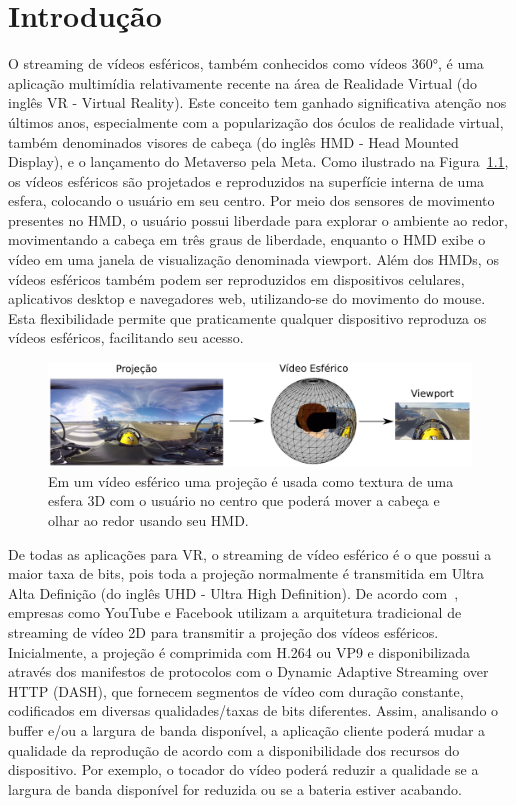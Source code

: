 \chapter{Introdução}\label{Cap:Introduction}


O streaming de vídeos esféricos, também conhecidos como vídeos 360°, é uma aplicação multimídia relativamente recente na área de Realidade Virtual (do inglês VR - Virtual Reality). Este conceito tem ganhado significativa atenção nos últimos anos, especialmente com a popularização dos óculos de realidade virtual, também denominados visores de cabeça (do inglês HMD - Head Mounted Display), e o lançamento do Metaverso pela Meta. Como ilustrado na Figura~\ref{fig:video360}, os vídeos esféricos são projetados e reproduzidos na superfície interna de uma esfera, colocando o usuário em seu centro. Por meio dos sensores de movimento presentes no HMD, o usuário possui liberdade para explorar o ambiente ao redor, movimentando a cabeça em três graus de liberdade, enquanto o HMD exibe o vídeo em uma janela de visualização denominada viewport. Além dos HMDs, os vídeos esféricos também podem ser reproduzidos em dispositivos celulares, aplicativos desktop e navegadores web, utilizando-se do movimento do mouse. Esta flexibilidade permite que praticamente qualquer dispositivo reproduza os vídeos esféricos, facilitando seu acesso.

\begin{figure}[h]
	\centering
	\includegraphics[width=0.8\columnwidth]{fig/viewport.pdf}
	\caption{Em um vídeo esférico uma projeção é usada como textura de uma esfera 3D com o usuário no centro que poderá mover a cabeça e olhar ao redor usando seu HMD.}
	\label{fig:video360}
\end{figure}

De todas as aplicações para VR, o streaming de vídeo esférico é o que possui a maior taxa de bits, pois toda a projeção normalmente é transmitida em Ultra Alta Definição (do inglês UHD - Ultra High Definition). De acordo com~\cite{Zhou2017, Liu2017}, empresas como YouTube e Facebook utilizam a arquitetura tradicional de streaming de vídeo 2D para transmitir a projeção dos vídeos esféricos. Inicialmente, a projeção é comprimida com H.264 ou VP9 e disponibilizada através dos manifestos de protocolos com o Dynamic Adaptive Streaming over HTTP (DASH), que fornecem segmentos de vídeo com duração constante, codificados em diversas qualidades/taxas de bits diferentes. Assim, analisando o buffer e/ou a largura de banda disponível, a aplicação cliente poderá mudar a qualidade da reprodução de acordo com a disponibilidade dos recursos do dispositivo. Por exemplo, o tocador do vídeo poderá reduzir a qualidade se a largura de banda disponível for reduzida ou se a bateria estiver acabando.

